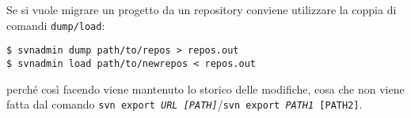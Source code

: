 Se si vuole migrare un progetto da un repository conviene utilizzare la coppia di comandi \texttt{dump/load}:

\begin{lstlisting}
$ svnadmin dump path/to/repos > repos.out
$ svnadmin load path/to/newrepos < repos.out
\end{lstlisting}

perché così facendo viene mantenuto lo storico delle modifiche, cosa che non viene fatta dal comando \texttt{svn export \textit{URL [PATH]}}/\texttt{svn export \textit{PATH1} [PATH2]}.